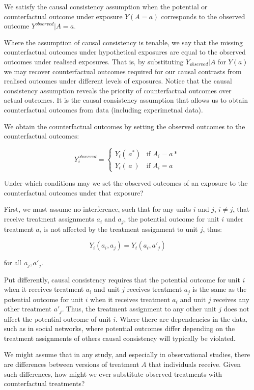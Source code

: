 \documentclass[
  singlecolumn]{report}
\begin{document}
We satisfy the causal consistency assumption when the potential or
counterfactual outcome under exposure \(Y(A=a)\) corresponds to the
observed outcome \(Y^{observed}|A=a\).

Where the assumption of causal consistency is tenable, we say that the
missing counterfactual outcomes under hypothetical exposures are equal
to the observed outcomes under realised exposures. That is, by
substituting \(Y_{observed}|A\) for \(Y(a)\) we may recover
counterfactual outcomes required for our causal contrasts from realised
outcomes under different levels of exposures. Notice that the causal
consistency assumption reveals the priority of counterfactual outcomes
over actual outcomes. It is the causal consistency assumption that
allows us to obtain counterfactual outcomes from data (including
experimetnal data).

We obtain the counterfactual outcomes by setting the observed outcomes
to the counterfactual outcomes:

\[
Y^{observed}_i = 
\begin{cases} 
Y_i(~a^*) & \text{if } A_i = a* \\
Y_i(~a~) & \text{if } A_i = a
\end{cases}
\]

Under which conditions may we set the observed outcomes of an exposure
to the counterfactual outcomes under that exposure?

First, we must assume no interference, such that for any units \(i\) and
\(j\), \(i \neq j\), that receive treatment assignments \(a_i\) and
\(a_j\), the potential outcome for unit \(i\) under treatment \(a_i\) is
not affected by the treatment assignment to unit \(j\), thus:

\[Y_i(a_i, a_j) = Y_i(a_i, a'_j)\]

for all \(a_j, a'_j\).

Put differently, causal consistency requires that the potential outcome
for unit \(i\) when it receives treatment \(a_i\) and unit \(j\)
receives treatment \(a_j\) is the same as the potential outcome for unit
\(i\) when it receives treatment \(a_i\) and unit \(j\) receives any
other treatment \(a'_j\). Thus, the treatment assignment to any other
unit \(j\) does not affect the potential outcome of unit \(i\). Where
there are dependencies in the data, such as in social networks, where
potential outcomes differ depending on the treatment assignments of
others causal consistency will typically be violated.

We might assume that in any study, and especially in observational
studies, there are differences between versions of treatment \(A\) that
individuals receive. Given such differences, how might we ever
substitute observed treatments with counterfactual treatments?
\end{document}
